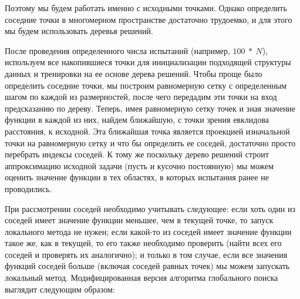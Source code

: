 \documentclass[12pt, a4paper, russian]{article}
\begin{document}



Поэтому мы будем работать именно с исходными точками. Однако определить соседние точки в многомерном пространстве достаточно трудоемко, и для этого мы будем использовать деревья решений. 

После проведения определенного числа испытаний (например, $100\ \ast\ N$), используем все накопившиеся точки для инициализации подходящей структуры данных и тренировки на ее основе дерева решений. Чтобы проще было определить соседние точки, мы построим равномерную сетку с определенным шагом по каждой из размерностей, после чего передадим эти точки на вход предсказанию по дереву. Теперь, имея равномерную сетку точек и зная значение функции в каждой из них, найдем ближайшую, с точки зрения евклидова расстояния, к исходной. Эта ближайшая точка является проекцией изначальной точки на равномерную сетку и что бы определить  ее соседей, достаточно  просто перебрать индексы соседей. К тому же поскольку дерево решений строит аппроксимацию исходной задачи (пусть и кусочно постоянную) мы можем оценить значение функции в тех областях, в которых испытания ранее не проводились.

При рассмотрении соседей необходимо учитывать следующее: если хоть один из соседей имеет значение функции меньшее, чем в текущей точке, то запуск локального метода не нужен; если какой-то из соседей имеет значение функции такое же, как в текущей, то его также необходимо проверить (найти всех его соседей и проверять их аналогично); и только в том случае, если все значения функций соседей больше (включая соседей равных точек) мы можем запускать локальный метод. Модифицированная версия алгоритма глобального поиска выглядит следующим образом:
\end{document}
